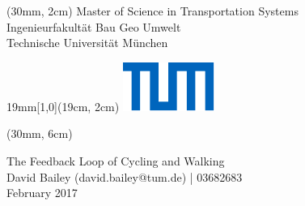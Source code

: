 \begin{titlepage}
\def\coverborderleft{30mm}

\begin{textblock*}{\textwidth}(\coverborderleft, 2cm)
\noindent
\textcolor{UniversitaetFarbe} {
  \fontsize{9}{11}\selectfont
  \sffamily Master of Science in Transportation Systems\\
  \sffamily Ingenieurfakultät Bau Geo Umwelt\\
  \sffamily Technische Universität München}
\end{textblock*}

\begin{textblock*}{19mm}[1,0](19cm, 2cm)
  \includegraphics{TUM_blau.pdf}
\end{textblock*}

\begin{textblock*}{\paperwidth}(\coverborderleft, 6cm)
\raggedright
  \sffamily \huge{The Feedback Loop of Cycling and Walking} \\
  \sffamily \Large{David Bailey (david.bailey@tum.de) | 03682683}\\
  \sffamily \large{February 2017}\\
\end{textblock*}
~\\
\end{titlepage}
